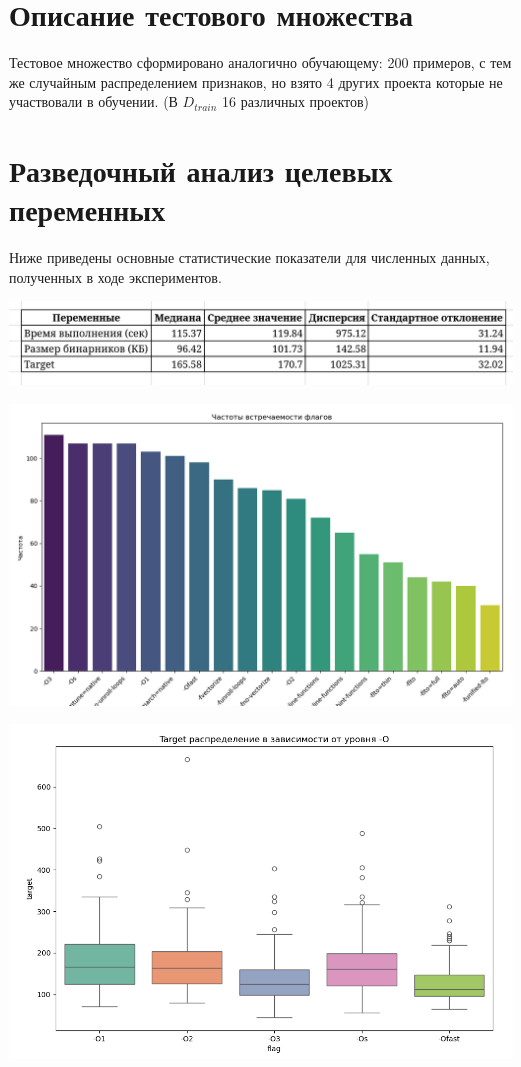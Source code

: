 \documentclass[12pt, oneside]{book}
\begin{document}
\section{Описание тестового множества}
Тестовое множество сформировано аналогично обучающему: 200 примеров,
с тем же случайным распределением признаков, но взято 4 других проекта
которые не участвовали в обучении. (В $D_{train}$ 16 различных проектов)

\section{Разведочный анализ целевых переменных}
Ниже приведены основные статистические показатели для численных
данных, полученных в ходе экспериментов.

\noindent
\includegraphics[width=1\textwidth]{image_1.png}

\noindent
\includegraphics[width=1\textwidth]{image_2.png}

\vspace*{0.25cm}
\noindent
\includegraphics[width=1\textwidth]{image_3.png}
\end{document}

